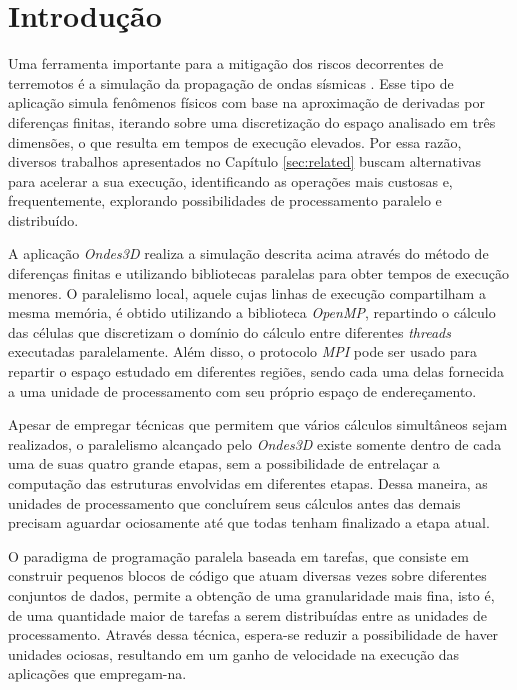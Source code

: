 \documentclass[cic,tc]{iiufrgs}
\begin{document}
\tableofcontents


\chapter{Introdução}
Uma ferramenta importante para a mitigação dos riscos decorrentes de terremotos é a simulação da propagação de ondas sísmicas \cite{Dupros2010HighperformanceFS}. Esse tipo de aplicação
simula fenômenos físicos com base na aproximação de derivadas por diferenças finitas, iterando sobre uma discretização do espaço analisado em três dimensões, o que resulta em tempos
de execução elevados. Por essa razão, diversos trabalhos \cite{boito, dupros:hal-00797682, victor} apresentados no Capítulo \ref{sec:related} buscam alternativas para acelerar a sua
execução, identificando as operações mais custosas e, frequentemente, explorando possibilidades de processamento paralelo e distribuído.

A aplicação \textit{Ondes3D} realiza a simulação descrita acima através do método de diferenças finitas e utilizando bibliotecas paralelas para obter tempos de execução menores. O
paralelismo local, aquele cujas linhas de execução compartilham a mesma memória, é obtido utilizando a biblioteca \textit{OpenMP}, repartindo o cálculo das células que discretizam o
domínio do cálculo entre diferentes \textit{threads} executadas paralelamente. Além disso, o protocolo \textit{MPI} pode ser usado para repartir o espaço estudado em diferentes regiões,
sendo cada uma delas fornecida a uma unidade de processamento com seu próprio espaço de endereçamento.

Apesar de empregar técnicas que permitem que vários cálculos simultâneos sejam realizados, o paralelismo alcançado pelo \textit{Ondes3D} existe somente dentro de cada uma de suas
quatro grande etapas, sem a possibilidade de entrelaçar a computação das estruturas envolvidas em diferentes etapas. Dessa maneira, as unidades de processamento que concluírem seus
cálculos antes das demais precisam aguardar ociosamente até que todas tenham finalizado a etapa atual.

O paradigma de programação paralela baseada em tarefas, que consiste em construir pequenos blocos de código que atuam diversas vezes sobre diferentes conjuntos de dados, permite a
obtenção de uma granularidade mais fina, isto é, de uma quantidade maior de tarefas a serem distribuídas entre as unidades de processamento. Através dessa técnica, espera-se
reduzir a possibilidade de haver unidades ociosas, resultando em um ganho de velocidade na execução das aplicações que empregam-na.
\end{document}
